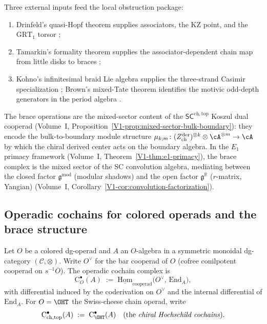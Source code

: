 \begin{remark}%
\label{rem:massey-rrr-yangian-verification}%
Three external inputs feed the local obstruction package:
\begin{enumerate}
 \item Drinfeld's quasi-Hopf theorem supplies associators, the KZ
 point, and the $\mathrm{GRT}_1$ torsor
 \cite{Drinfeld90QuasiHopf};
 \item Tamarkin's formality theorem supplies the associator-dependent
 chain map from little disks to braces \cite{Tamarkin2003};
 \item Kohno's infinitesimal braid Lie algebra supplies the
 three-strand Casimir specialization \cite{Kohno1987}; Brown's
 mixed-Tate theorem identifies the motivic odd-depth generators in
 the period algebra \cite{BrownMixedTate}.
\end{enumerate}
\end{remark}

\begin{remark}
\label{rem:brace-e1-primacy}
The brace operations are the mixed-sector content of the
$\mathsf{SC}^{\mathrm{ch,top}}$ Koszul dual cooperad
(Volume~I, Proposition~\ref*{V1-prop:mixed-sector-bulk-boundary}):
they encode the bulk-to-boundary module structure
$\mu_{k;m}\colon (Z_{\mathrm{ch}}^{\mathrm{der}})^{\otimes k}
\otimes \cA^{\otimes m} \to \cA$
by which the chiral derived center acts on the boundary algebra.
In the $E_1$ primacy framework
(Volume~I, Theorem~\ref*{V1-thm:e1-primacy}),
the brace complex is the mixed sector of the SC convolution algebra,
mediating between the closed factor
$\mathfrak{g}^{\mathrm{mod}}$ (modular shadows) and the open factor
$\mathfrak{g}^{\mathbb{R}}$ ($r$-matrix, Yangian)
(Volume~I, Corollary~\ref*{V1-cor:convolution-factorization}).
\end{remark}

\subsection{Operadic cochains for colored operads and the brace structure}
\label{subsec:operadic-cochains-brace}
Let $O$ be a colored dg-operad and $A$ an $O$-algebra in a symmetric monoidal dg-category $(\mathcal C,\otimes)$.
Write $O^\vee$ for the bar cooperad of $O$ (cofree conilpotent cooperad on $s^{-1}\overline O$).
The operadic cochain complex is
\[
\mathrm{C}^\bullet_O(A) \;:=\; \underline{\mathrm{Hom}}_{\text{cooperad}} \bigl( O^\vee,\, \mathrm{End}_A \bigr),
\]
with differential induced by the coderivation on $O^\vee$ and the internal differential of $\mathrm{End}_A$.
For $O = \OHT$ the Swiss-cheese chain operad, write
\[
\mathrm{C}^\bullet_{\mathrm{ch,top}}(A)\;:=\;\mathrm{C}^\bullet_{\OHT}(A)
\quad\text{(the \emph{chiral Hochschild cochains})}.
\]

